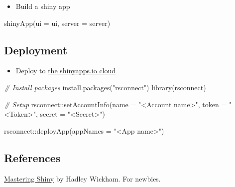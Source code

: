 \documentclass[
]{book}
\newenvironment{Shaded}{\begin{snugshade}}{\end{snugshade}}
\newcommand{\AttributeTok}[1]{\textcolor[rgb]{0.77,0.63,0.00}{#1}}
\newcommand{\CommentTok}[1]{\textcolor[rgb]{0.56,0.35,0.01}{\textit{#1}}}
\newcommand{\FunctionTok}[1]{\textcolor[rgb]{0.00,0.00,0.00}{#1}}
\newcommand{\NormalTok}[1]{#1}
\newcommand{\SpecialCharTok}[1]{\textcolor[rgb]{0.00,0.00,0.00}{#1}}
\newcommand{\StringTok}[1]{\textcolor[rgb]{0.31,0.60,0.02}{#1}}
\providecommand{\tightlist}{%
  \setlength{\itemsep}{0pt}\setlength{\parskip}{0pt}}
\begin{document}
\begin{itemize}
\tightlist
\item
  Build a shiny app
\end{itemize}

\begin{Shaded}
\begin{Highlighting}[]
\FunctionTok{shinyApp}\NormalTok{(}\AttributeTok{ui =}\NormalTok{ ui, }\AttributeTok{server =}\NormalTok{ server)}
\end{Highlighting}
\end{Shaded}

\hypertarget{deployment}{%
\subsection{Deployment}\label{deployment}}

\begin{itemize}
\tightlist
\item
  Deploy to \href{https://www.shinyapps.io/?_ga=2.5503866.871102833.1602978469-100003412.1602392815}{the shinyapps.io cloud}
\end{itemize}

\begin{Shaded}
\begin{Highlighting}[]
\CommentTok{\# Install packages }
\FunctionTok{install.packages}\NormalTok{(}\StringTok{"rsconnect"}\NormalTok{)}
\FunctionTok{library}\NormalTok{(rsconnect)}

\CommentTok{\# Setup }
\NormalTok{rsconnect}\SpecialCharTok{::}\FunctionTok{setAccountInfo}\NormalTok{(}\AttributeTok{name =} \StringTok{"\textless{}Account name\textgreater{}"}\NormalTok{, }
                          \AttributeTok{token =} \StringTok{"\textless{}Token\textgreater{}"}\NormalTok{,}
                          \AttributeTok{secret =} \StringTok{"\textless{}Secret\textgreater{}"}\NormalTok{)}

\NormalTok{rsconnect}\SpecialCharTok{::}\FunctionTok{deployApp}\NormalTok{(}\AttributeTok{appNames =} \StringTok{"\textless{}App name\textgreater{}"}\NormalTok{)}
\end{Highlighting}
\end{Shaded}

\hypertarget{references-3}{%
\subsection{References}\label{references-3}}

\href{https://mastering-shiny.org/}{Mastering Shiny} by Hadley Wickham. For newbies.
\end{document}
